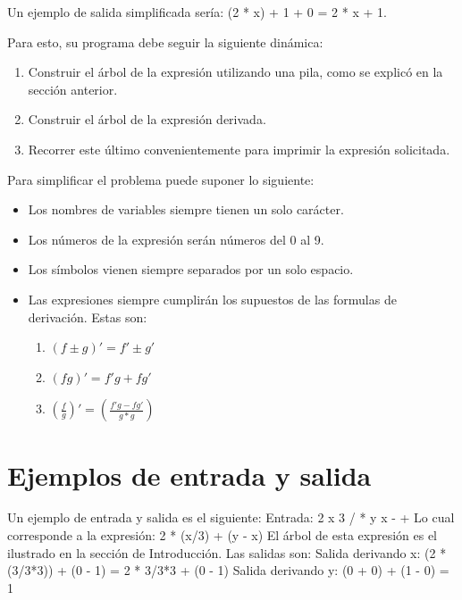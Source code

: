 \documentclass[dcc]{fcfmcourse}
\begin{document}
Un ejemplo de salida simplificada sería: (2 * x) + 1 + 0 = 2 * x + 1.

Para esto, su programa debe seguir la siguiente dinámica:
\begin{enumerate}

    \item Construir el árbol de la expresión utilizando una pila, como se explicó en la sección anterior.
    
    \item Construir el árbol de la expresión derivada.
    
    \item Recorrer este último convenientemente para imprimir la expresión solicitada.
\end{enumerate}

Para simplificar el problema puede suponer lo siguiente: 
\begin{itemize}
    \item Los nombres de variables siempre tienen un solo carácter.
    
    \item Los números de la expresión serán números del 0 al 9.
    
    \item Los símbolos vienen siempre separados por un solo espacio.
    
    \item Las expresiones siempre cumplirán los supuestos de las formulas de derivación. Estas son: 
    \begin{enumerate}
        \item $({f} ± {g})' = f' ± g'$
    
        \item $({f}{g})' = f'g + fg'$
    
        \item $\left(\frac{f}{g}\right)' = \left(\frac{f'g- fg'}{g*g}\right)$
    
    \end{enumerate}
    
\end{itemize}

\section{Ejemplos de entrada y salida}

Un ejemplo de entrada y salida es el siguiente:
\newline\newline
Entrada: 2 x 3 / * y x - +
\newline\newline
Lo cual corresponde a la expresión: 2 * (x/3) + (y - x)
\newline\newline
El árbol de esta expresión es el ilustrado en la sección de Introducción.
\newline\newline
Las salidas son:
\newline
Salida derivando x: (2 * (3/3*3)) + (0 - 1) = 2 * 3/3*3 + (0 - 1)
\newline\newline
Salida derivando y: (0 + 0) + (1 - 0) = 1
\end{document}
